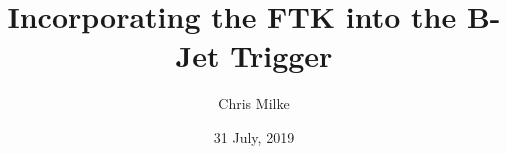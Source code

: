 \documentclass{beamer}
\begin{document}
\title{Incorporating the FTK into the B-Jet Trigger}   
\author{Chris Milke} 
\date{31 July, 2019} 

\frame{\titlepage} 









\end{document}
